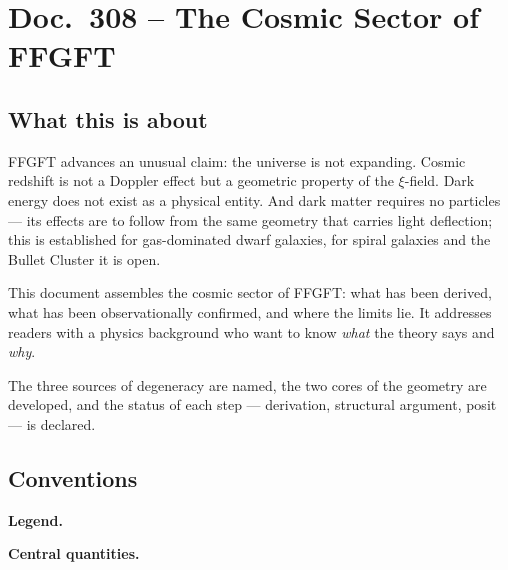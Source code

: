 \maketitle
\tableofcontents

\chapter*{Doc.~308 -- The Cosmic Sector of FFGFT}


\section*{What this is about}

FFGFT advances an unusual claim: the universe is not expanding.
Cosmic redshift is not a Doppler effect but a geometric property of the
$\xi$-field. Dark energy does not exist as a physical entity. And dark
matter requires no particles — its effects are to follow from the same geometry
that carries light deflection; this is established for gas-dominated dwarf
galaxies, for spiral galaxies and the Bullet Cluster it is open.

This document assembles the cosmic sector of FFGFT: what has been derived,
what has been observationally confirmed, and where the limits lie.
It addresses readers with a physics background who want to know \emph{what}
the theory says and \emph{why}.

The three sources of degeneracy are named, the two cores of the geometry
are developed, and the status of each step — derivation, structural
argument, posit — is declared.

\section*{Conventions}

\noindent\textbf{Legend.}

\medskip


\medskip
\noindent\textbf{Central quantities.}

